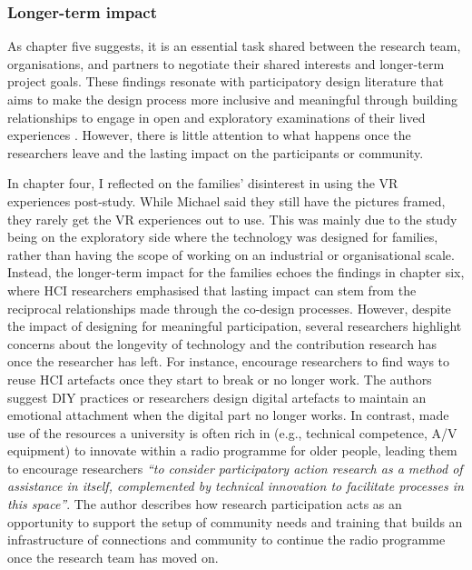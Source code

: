 \subsubsection{Longer-term impact}
\label{LongTermImpact}
As chapter five suggests, it is an essential task shared between the research team, organisations, and partners to negotiate their shared interests and longer-term project goals. These findings resonate with participatory design literature that aims to make the design process more inclusive and meaningful through building relationships to engage in open and exploratory examinations of their lived experiences \citep{wang_construction_2013,bodker2018participatory}. However, there is little attention to what happens once the researchers leave and the lasting impact on the participants or community. 

In chapter four, I reflected on the families' disinterest in using the VR experiences post-study. While Michael said they still have the pictures framed, they rarely get the VR experiences out to use. This was mainly due to the study being on the exploratory side where the technology was designed for families, rather than having the scope of working on an industrial or organisational scale. Instead, the longer-term impact for the families echoes the findings in chapter six, where HCI researchers emphasised that lasting impact can stem from the reciprocal relationships made through the co-design processes. However, despite the impact of designing for meaningful participation, several researchers highlight concerns about the longevity of technology and the contribution research has once the researcher has left. For instance, \cite{arakelyan2013facilitation} encourage researchers to find ways to reuse HCI artefacts once they start to break or no longer work. The authors suggest DIY practices or researchers design digital artefacts to maintain an emotional attachment when the digital part no longer works. In contrast, \cite{reuter2021content} made use of the resources a university is often rich in (e.g., technical competence, A/V equipment) to innovate within a radio programme for older people, leading them to encourage researchers \textit{``to consider participatory action research as a method of assistance in itself, complemented by technical innovation to facilitate processes in this space''}. The author describes how research participation acts as an opportunity to support the setup of community needs and training that builds an infrastructure of connections and community to continue the radio programme once the research team has moved on.

